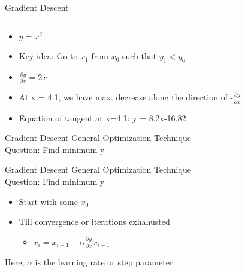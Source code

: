 \documentclass{beamer}
\begin{document}
\begin{frame}{Gradient Descent}
\begin{columns}
	
	
	\begin{column}{0.6\textwidth}
		\begin{adjustbox}{max totalsize={\textwidth},center}
		\end{adjustbox}
	\end{column}
	
\end{columns}
\begin{itemize}[<+->]
	\item $y = x^2$
	\item Key idea: Go to $x_{1}$ from $x_{0} $ such that $y_{1}< y_{0}$
	\item $\frac{\partial{y}}{\partial{x}} = 2x$
	\item At x = 4.1, we have max. decrease along the direction of -$\frac{\partial{y}}{\partial{x}}$
	\item Equation of tangent at x=4.1: y = 8.2x-16.82
\end{itemize}



\end{frame}

	
		\begin{frame}{Gradient Descent}
	General Optimization Technique\\
	Question: Find minimum y
\end{frame}

\begin{frame}{Gradient Descent}
General Optimization Technique\\
Question: Find minimum y
\begin{itemize}[<+->]
\item Start with some $x_{0}$
\item Till convergence or iterations exhahusted
\begin{itemize}
	\item $x_{i} = x_{i-1} - \alpha\frac{\partial y }{\partial x} x_{i-1}$
\end{itemize}

\end{itemize}
\pause Here, $\alpha$ is the learning rate or step parameter
\end{frame}
	
\end{document}
